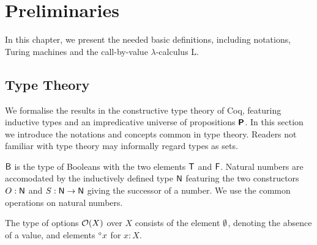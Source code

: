 
\newcommand*{\movel}{\textsf{L}}
\newcommand*{\mover}{\textsf{R}}
\newcommand*{\moven}{\textsf{N}}

\newcommand*{\tmleft}[1]{\textsf{left}~#1}
\newcommand*{\tmright}[1]{\textsf{right}~#1}
\newcommand*{\tmcurrent}[1]{\textsf{current}~#1}

\newcommand{\finType}{\textsf{finType}}
\newcommand{\eqType}{\textsf{eqType}}

\newcommand{\findex}[1]{\ensuremath{\textsf{index}~#1}}

\newcommand{\bigO}[1]{\mathcal{O}{(#1)}}

\newcommand{\encsize}[1]{\left\lVert#1\right\rVert}

\newcommand{\redP}{\ensuremath{\prec_p}}

\chapter{Preliminaries}\label{chap:preliminaries}
In this chapter, we present the needed basic definitions, including notations, Turing machines and the call-by-value $\lambda$-calculus L.

\section{Type Theory}
We formalise the results in the constructive type theory of Coq, featuring inductive types and an impredicative universe of propositions $\textsf{\bfseries P}$. In this section we introduce the notations and concepts common in type theory. Readers not familiar with type theory may informally regard types as sets.

$\textsf{B}$ is the type of Booleans with the two elements $\mathsf{T}$ and $\mathsf{F}$.
Natural numbers are accomodated by the inductively defined type $\mathsf{N}$ featuring the two constructors $O : \mathsf{N}$ and $S : \mathsf{N} \rightarrow \mathsf{N}$ giving the successor of a number. We use the common operations on natural numbers.

The type of options $\mathcal{O}{(X)}$ over $X$ consists of the element $\emptyset$, denoting the absence of a value, and elements $\prescript{\circ}{}x$ for $x : X$.

